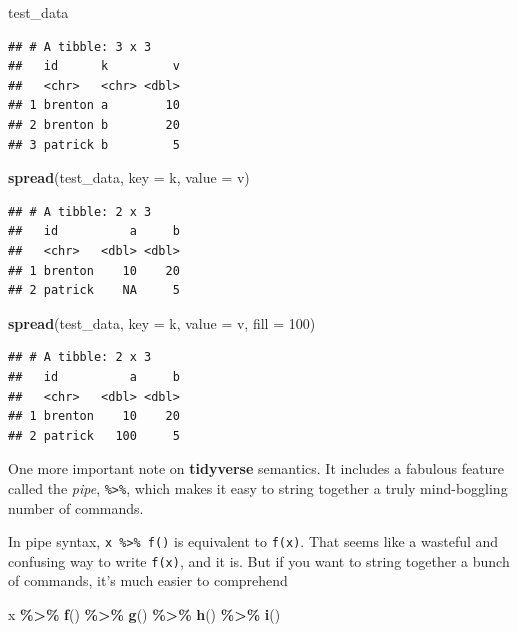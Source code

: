 \documentclass[
  12pt,
  oneside,openany]{book}
\newenvironment{Shaded}{\begin{snugshade}}{\end{snugshade}}
\newcommand{\DataTypeTok}[1]{\textcolor[rgb]{0.13,0.29,0.53}{#1}}
\newcommand{\DecValTok}[1]{\textcolor[rgb]{0.00,0.00,0.81}{#1}}
\newcommand{\KeywordTok}[1]{\textcolor[rgb]{0.13,0.29,0.53}{\textbf{#1}}}
\newcommand{\NormalTok}[1]{#1}
\newcommand{\OperatorTok}[1]{\textcolor[rgb]{0.81,0.36,0.00}{\textbf{#1}}}
\newcommand{\StringTok}[1]{\textcolor[rgb]{0.31,0.60,0.02}{#1}}
\begin{document}
\begin{Shaded}
\begin{Highlighting}[]
\NormalTok{test\_data}
\end{Highlighting}
\end{Shaded}

\begin{verbatim}
## # A tibble: 3 x 3
##   id      k         v
##   <chr>   <chr> <dbl>
## 1 brenton a        10
## 2 brenton b        20
## 3 patrick b         5
\end{verbatim}

\begin{Shaded}
\begin{Highlighting}[]
\KeywordTok{spread}\NormalTok{(test\_data, }\DataTypeTok{key =}\NormalTok{ k, }\DataTypeTok{value =}\NormalTok{ v)}
\end{Highlighting}
\end{Shaded}

\begin{verbatim}
## # A tibble: 2 x 3
##   id          a     b
##   <chr>   <dbl> <dbl>
## 1 brenton    10    20
## 2 patrick    NA     5
\end{verbatim}

\begin{Shaded}
\begin{Highlighting}[]
\KeywordTok{spread}\NormalTok{(test\_data, }\DataTypeTok{key =}\NormalTok{ k, }\DataTypeTok{value =}\NormalTok{ v, }\DataTypeTok{fill =} \DecValTok{100}\NormalTok{)}
\end{Highlighting}
\end{Shaded}

\begin{verbatim}
## # A tibble: 2 x 3
##   id          a     b
##   <chr>   <dbl> <dbl>
## 1 brenton    10    20
## 2 patrick   100     5
\end{verbatim}

One more important note on \textbf{tidyverse} semantics. It includes a fabulous feature called the \emph{pipe}, \texttt{\%\textgreater{}\%}, which makes it easy to string together a truly mind-boggling number of commands.

In pipe syntax, \texttt{x\ \%\textgreater{}\%\ f()} is equivalent to \texttt{f(x)}. That seems like a wasteful and confusing way to write \texttt{f(x)}, and it is. But if you want to string together a bunch of commands, it's much easier to comprehend

\begin{Shaded}
\begin{Highlighting}[]
\NormalTok{x }\OperatorTok{\%\textgreater{}\%}
\StringTok{  }\KeywordTok{f}\NormalTok{() }\OperatorTok{\%\textgreater{}\%}
\StringTok{  }\KeywordTok{g}\NormalTok{() }\OperatorTok{\%\textgreater{}\%}
\StringTok{  }\KeywordTok{h}\NormalTok{() }\OperatorTok{\%\textgreater{}\%}
\StringTok{  }\KeywordTok{i}\NormalTok{()}
\end{Highlighting}
\end{Shaded}
\end{document}
